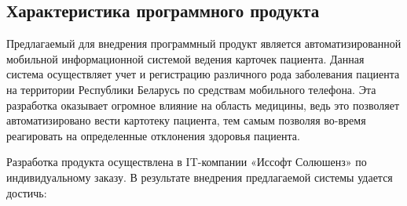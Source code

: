 









\FPround{}


\subsection{Характеристика программного продукта }

Предлагаемый для внедрения программный продукт является автоматизированной мобильной информационной системой ведения карточек пациента. Данная система осуществляет учет и регистрацию различного рода заболевания пациента на территории Республики Беларусь по средствам мобильного телефона. Эта разработка оказывает огромное  влияние на область медицины, ведь это позволяет автоматизировано вести картотеку пациента, тем самым позволяя во-время реагировать на определенные отклонения здоровья пациента.

Разработка продукта осуществлена в IT-компании «Иссофт Солюшенз» по индивидуальному заказу. В результате внедрения предлагаемой системы удается достичь:

